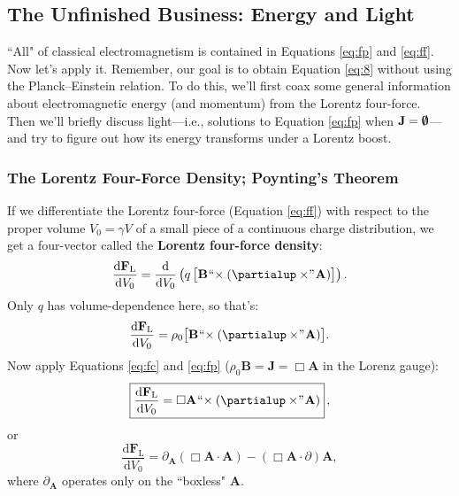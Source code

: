 \documentclass[12pt]{article}
\renewcommand{\vv}[1]{\mathbf{#1}}
\newcommand{\dd}[1]{\mathrm{d}#1}
\begin{document}
\subsection{The Unfinished Business: Energy and Light}

``All" of classical electromagnetism is contained in Equations \ref{eq:fp} and \ref{eq:ff}. Now let's apply it. Remember, our goal is to obtain Equation \ref{eq:8} without using the Planck--Einstein relation. To do this, we'll first coax some general information about electromagnetic energy (and momentum) from the Lorentz four-force. Then we'll briefly discuss light---i.e., solutions to Equation \ref{eq:fp} when $\vv J = \textrm{\mbox{\boldmath $\emptyset$}}$---and try to figure out how its energy transforms under a Lorentz boost.

\subsubsection{The Lorentz Four-Force Density; Poynting's Theorem}\label{sssec:lffd}

If we differentiate the Lorentz four-force (Equation \ref{eq:ff}) with respect to the proper volume ${V_0 = \gamma V}$ of a small piece of a continuous charge distribution, we get a four-vector called the \textbf{Lorentz four-force density}:
\begin{equation*}
\dfrac{\dd \vv F_{\mathrm{L}}}{\dd V_0} = \dfrac{\dd}{\dd V_0} \left( q \, \bigl[ \vv B \mkern1mu `` \mkern-4mu \times (\partialup \times \mkern-4mu " \mkern1mu \vv A) \bigr]  \right) .
\end{equation*}
Only $q$ has volume-dependence here, so that's:
\begin{equation*}
\dfrac{\dd \vv F_{\mathrm{L}}}{\dd V_0} = \rho_0 \bigl[ \vv B \mkern1mu `` \mkern-4mu \times (\partialup \times \mkern-4mu " \mkern1mu \vv A) \bigr] .
\end{equation*}
Now apply Equations \ref{eq:fc} and \ref{eq:fp} ($\rho_0 \vv B = \vv J = \Box \vv A$ in the Lorenz gauge):
\begin{equation}\label{eq:lffd}
\boxed{ \dfrac{\dd \vv F_{\mathrm{L}}}{\dd V_0} = \Box \vv A \mkern1mu `` \mkern-4mu \times (\partialup \times \mkern-4mu " \mkern1mu \vv A) } \, ,
\end{equation}
or
\begin{equation*}
\dfrac{\dd \vv F_{\mathrm{L}}}{\dd V_0} = \partialup_{\vv A} (\Box \vv A \cdot \vv A) - (\Box \vv A \cdot \partialup) \vv A ,
\end{equation*}
where $\partialup_{\vv A}$ operates only on the ``boxless" $\vv A$.
\end{document}
